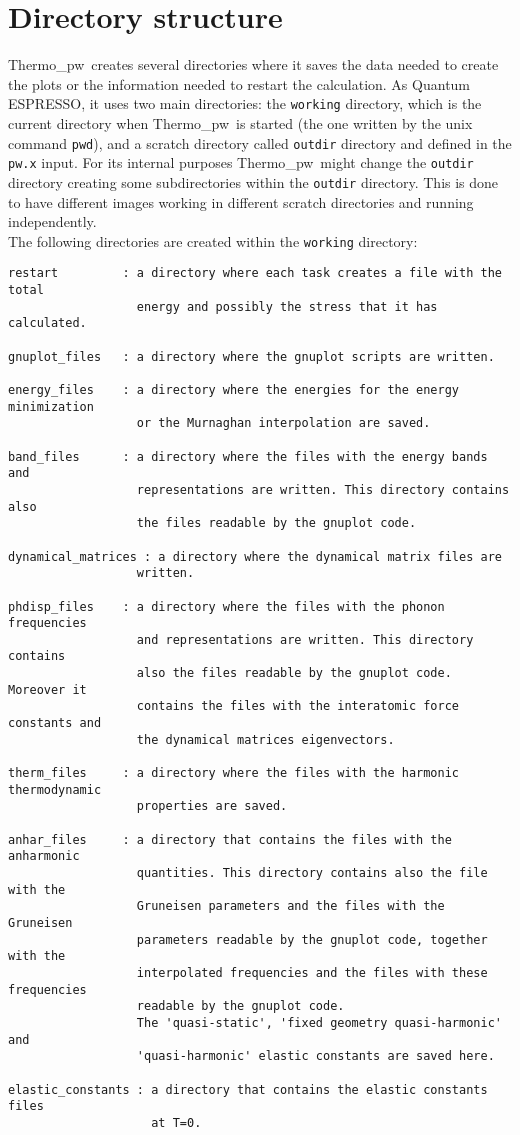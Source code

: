 \documentclass[12pt,a4paper,twoside]{report}
\def\qe{{\sc Quantum ESPRESSO}}
\def\tpw{{\sc Thermo}\_{\sc pw}}
\begin{document}
\newpage
{\color{dark-blue}\chapter{Directory structure}}
\color{black}
\tpw\ creates several directories where it saves the data needed to
create the plots or the information needed to restart the calculation.  
As \qe, it uses two main directories: the \texttt{working} 
directory, which is the current directory when \tpw\ is started 
(the one written by the unix command \texttt{pwd}), and a scratch directory 
called \texttt{outdir} directory and defined in the \texttt{pw.x} input. For its
internal purposes \tpw\ might change the \texttt{outdir} directory creating
some subdirectories within the \texttt{outdir} directory. This is done to
have different images working in different scratch directories and running
independently. \\
The following directories are created within the \texttt{working} directory:
\begin{footnotesize}
\begin{verbatim}
restart         : a directory where each task creates a file with the total
                  energy and possibly the stress that it has calculated.

gnuplot_files   : a directory where the gnuplot scripts are written.

energy_files    : a directory where the energies for the energy minimization
                  or the Murnaghan interpolation are saved.

band_files      : a directory where the files with the energy bands and 
                  representations are written. This directory contains also
                  the files readable by the gnuplot code.

dynamical_matrices : a directory where the dynamical matrix files are
                  written.

phdisp_files    : a directory where the files with the phonon frequencies
                  and representations are written. This directory contains
                  also the files readable by the gnuplot code. Moreover it
                  contains the files with the interatomic force constants and
                  the dynamical matrices eigenvectors.

therm_files     : a directory where the files with the harmonic thermodynamic
                  properties are saved.

anhar_files     : a directory that contains the files with the anharmonic
                  quantities. This directory contains also the file with the
                  Gruneisen parameters and the files with the Gruneisen
                  parameters readable by the gnuplot code, together with the 
                  interpolated frequencies and the files with these frequencies
                  readable by the gnuplot code.
                  The 'quasi-static', 'fixed geometry quasi-harmonic' and
                  'quasi-harmonic' elastic constants are saved here.

elastic_constants : a directory that contains the elastic constants files
                    at T=0.
\end{verbatim}
\end{footnotesize}
\end{document}
